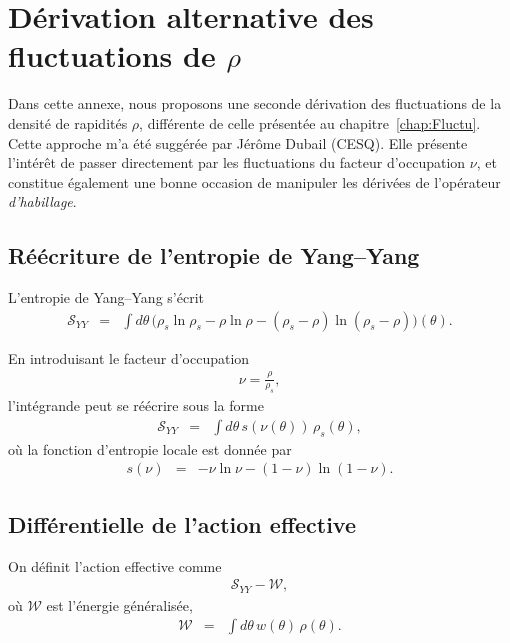 \chapter{Dérivation alternative des fluctuations de $\rho$}\label{annex:Jerome}
\minitoc

Dans cette annexe, nous proposons une seconde dérivation des fluctuations de la densité de rapidités $\rho$, différente de celle présentée au chapitre~\ref{chap:Fluctu}.  
Cette approche m’a été suggérée par Jérôme Dubail (\gls{CESQ}). Elle présente l’intérêt de passer directement par les fluctuations du facteur d’occupation $\nu$, et constitue également une bonne occasion de manipuler les dérivées de l’opérateur \emph{d’habillage}.

\section{Réécriture de l’entropie de Yang--Yang}

L’entropie de Yang--Yang s’écrit
\begin{eqnarray}
	\mathcal{S}_{YY} 
	&=& \int d \theta \, \Big( \rho_s \ln \rho_s - \rho \ln \rho - (\rho_s - \rho ) \ln (\rho_s - \rho ) \Big)(\theta).    
\end{eqnarray}

En introduisant le facteur d’occupation
\begin{eqnarray}
	\nu = \frac{\rho}{\rho_s},	
\end{eqnarray}
l’intégrande peut se réécrire sous la forme
\begin{eqnarray}
	\mathcal{S}_{YY} 
	&=& \int d\theta \, s(\nu(\theta))\, \rho_s(\theta), 	
\end{eqnarray}
où la fonction d’entropie locale est donnée par
\begin{eqnarray}
	s(\nu) &=& - \nu \ln \nu - (1 - \nu ) \ln (1 - \nu ).
\end{eqnarray}

\section{Différentielle de l’action effective}

On définit l’action effective comme
\begin{eqnarray}
	\mathcal{S}_{YY} - \mathcal{W},
\end{eqnarray}
où $\mathcal{W}$ est l’énergie généralisée,
\begin{eqnarray}
	\mathcal{W} &=& \int d\theta \, w(\theta)\, \rho(\theta).		
\end{eqnarray}

